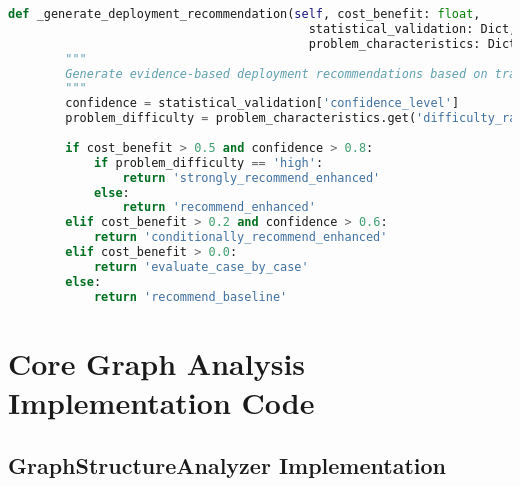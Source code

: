 \begin{lstlisting}[language=Python, caption=Trade-off Monitoring and Analysis Framework]
    def _generate_deployment_recommendation(self, cost_benefit: float, 
                                          statistical_validation: Dict, 
                                          problem_characteristics: Dict) -> str:
        """
        Generate evidence-based deployment recommendations based on trade-off analysis.
        """
        confidence = statistical_validation['confidence_level']
        problem_difficulty = problem_characteristics.get('difficulty_rating', 'moderate')
        
        if cost_benefit > 0.5 and confidence > 0.8:
            if problem_difficulty == 'high':
                return 'strongly_recommend_enhanced'
            else:
                return 'recommend_enhanced'
        elif cost_benefit > 0.2 and confidence > 0.6:
            return 'conditionally_recommend_enhanced'
        elif cost_benefit > 0.0:
            return 'evaluate_case_by_case'
        else:
            return 'recommend_baseline'
\end{lstlisting}

\section{Core Graph Analysis Implementation Code}
\label{appendix:core-graph-analysis}

\subsection{GraphStructureAnalyzer Implementation}
\label{appendix:graph-structure-analyzer}

